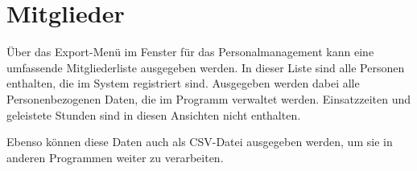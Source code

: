 \section{Mitglieder}
Über das Export-Menü im Fenster für das Personalmanagement kann eine umfassende Mitgliederliste ausgegeben werden.
In dieser Liste sind alle Personen enthalten, die im System registriert sind.
Ausgegeben werden dabei alle Personenbezogenen Daten, die im Programm verwaltet werden.
Einsatzzeiten und geleistete Stunden sind in diesen Ansichten nicht enthalten.

Ebenso können diese Daten auch als CSV-Datei ausgegeben werden, um sie in anderen Programmen weiter zu verarbeiten.
